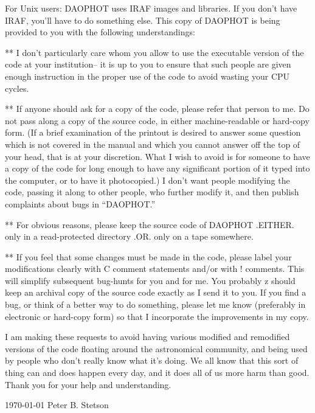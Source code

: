 For Unix users:  DAOPHOT uses IRAF images and libraries.  If you don't
have IRAF, you'll have to do something else.
\vfill
\eject
\noindent This copy of DAOPHOT is being provided to you with the following
understandings:

\item{**}  I don't particularly care whom you allow to use the
executable version of the code at your institution-- it is up to
you to ensure that such people are given enough instruction in the
proper use of the code to avoid wasting your CPU cycles.

\item{**}  If anyone should ask for a copy of the code, please refer
that person to me.  Do not pass along a copy of the source code, in
either machine-readable or hard-copy form.  (If a brief examination
of the printout is desired to answer some question which is not
covered in the manual and which you cannot answer off the top of
your head, that is at your discretion.  What I wish to avoid is for
someone to have a copy of the code for long enough to have any
significant portion of it typed into the computer, or to have it
photocopied.)  I don't want people modifying the code, passing it along
to other people, who further modify it, and then publish complaints
about bugs in ``DAOPHOT.''

\item{**}  For obvious reasons, please keep the source code of DAOPHOT
.EITHER. only in a read-protected directory .OR. only on a tape
somewhere.

\item{**}  If you feel that some changes must be made in the code,
please label your modifications clearly with C comment statements
and/or with     ! comments.  This will simplify subsequent bug-hunts
for you and for me.  You probably z    should keep an archival copy of
the source code exactly as I send it to you.  If you find a bug, or
think of a better way to do something, please let me know (preferably
in electronic or hard-copy form) so that I incorporate the improvements
in my copy.

\noindent I am making these requests to avoid having various modified
and remodified versions of the code floating around the astronomical
community, and being used by people who don't really know what it's
doing.  We all know that this sort of thing can and does happen every
day, and it does all of us more harm than good.  Thank you for your
help and understanding.

\vfill
\indent \today
\vfill
\indent Peter B. Stetson

